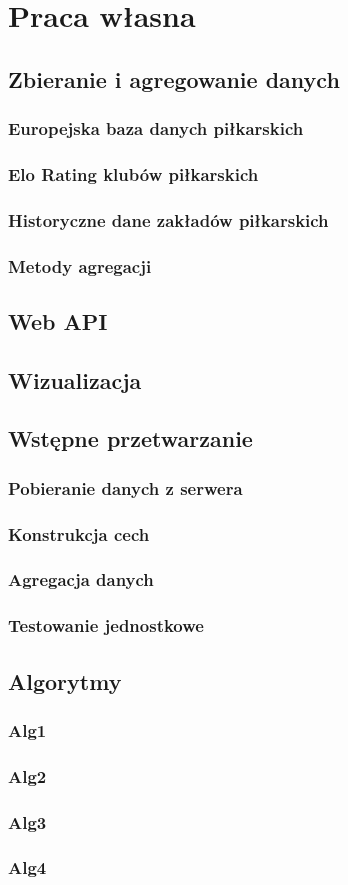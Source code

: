 \chapter{Praca własna}
    \section{Zbieranie i agregowanie danych}
        \subsection{Europejska baza danych piłkarskich}
        \subsection{Elo Rating klubów piłkarskich}
        \subsection{Historyczne dane zakładów piłkarskich}
        \subsection{Metody agregacji}
    \section{Web API}
    \section{Wizualizacja}
    \section{Wstępne przetwarzanie}
        \subsection{Pobieranie danych z serwera}
        \subsection{Konstrukcja cech}
        \subsection{Agregacja danych}
        \subsection{Testowanie jednostkowe}
    \section{Algorytmy}
        \subsection{Alg1}
        \subsection{Alg2}
        \subsection{Alg3}
        \subsection{Alg4}